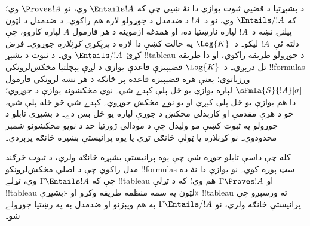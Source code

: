 \documentclass[../../../include/open-logic-section]{subfiles}
\begin{document}
      

\begin{explain}
  د بشپړتيا د قضيې ثبوت يوازې دا نۀ ښيي چې که
  $\Entails !A$ وي، نو $\Proves !A$ وي؛ که
  $\Entails/ !A$ وي، نو د~$!A$ د ضدمدل د جوړولو لاره هم راکوي۔
  د ضدمدل د لټون پيلنۍ نښه د~$!A$ لپاره نارښتيا ده، او
  همدغه ازموينه د هر فارمول $A$ لپاره کاروو، چې دلته ئې~$!A$ ليکو۔
  د~$\Log{K}$ په حالت کښې دا لاره د \emph{پرېکړې کړنلاره}
  جوړوي۔ فرض کړئ $\Entails/ !A$ وي۔ د
   ثبوت د بشپړ
  !!{tableau} د جوړولو طريقه راکوي، او دا طريقه تل درېږي۔
  د~$\Log{K}$ قضيېيزې قاعدې يوازې د لږې پېچلتيا
  مخکښ‌لرونکي !!{formula}s ورزياتوي؛ يعنې هره قضيېيزه قاعده
  پر څانګه د هر نښه لرونکي فارمول
  $\sFmla{S}{!A}[\sigma]$ لپاره يوازې يو ځل پلې کېدے شي۔
  نوي مخکښونه يوازې د
   جوړوي؛ دا هم
  يوازې يو ځل پلې کېږي او يو نوے مخکښ جوړوي۔
   کېدے شي څو
  ځله پلې شي، خو د هرې مقدمې او کارېدلي مخکښ د جوړې لپاره
  يو ځل بس دے۔ د بشپړې تابلو د جوړولو په ثبوت کښې مو وليدل
  چې د مودالي ژورتيا حد د نويو مخکښونو شمېر محدودوي۔ نو
  کړنلاره يا ټولې څانګې تړي يا يوه پرانيستې بشپړه څانګه پرېږدي۔

  کله چې داسې تابلو جوړه شي چې يوه پرانيستې بشپړه څانګه ولري،
  د  ثبوت څرګند مدل
  راکوي چې د اصلي مخکښ‌لرونکو !!{formula}s سټ پوره کوي۔ نو
  يوازې دا نۀ ده چې که $\Gamma \Entails !A$ وي، تړلے
  !!{tableau} او $\Gamma \Proves !A$ هم وي؛ که د تړلې
  !!{tableau} لټون په سمه منظمه طريقه وکړو او «بشپړې»
  !!{tableau} ته
  ورسېږو چې پرانيستې څانګه ولري، نو $\Gamma \Entails/ !A$ به هم وپېژنو او ضدمدل
  به په رښتيا جوړولے شو۔
\end{explain}
\end{document}
